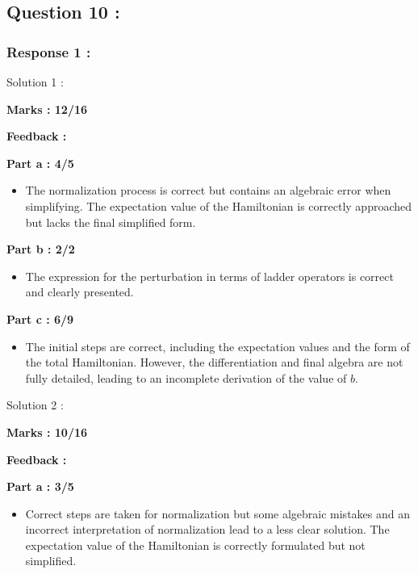 \documentclass[a4paper,11pt]{article}
\begin{document}
\subsection*{Question 10 :}

\subsubsection*{Response 1 :}

Solution 1 :

\textbf{Marks : 12/16}

\textbf{Feedback :}

\textbf{Part a : 4/5}

\begin{itemize}
    \item The normalization process is correct but contains an algebraic error when simplifying. The expectation value of the Hamiltonian is correctly approached but lacks the final simplified form.
\end{itemize}

\textbf{Part b : 2/2}

\begin{itemize}
    \item The expression for the perturbation in terms of ladder operators is correct and clearly presented.
\end{itemize}

\textbf{Part c : 6/9}

\begin{itemize}
    \item The initial steps are correct, including the expectation values and the form of the total Hamiltonian. However, the differentiation and final algebra are not fully detailed, leading to an incomplete derivation of the value of $b$.
\end{itemize}


Solution 2 :

\textbf{Marks : 10/16}

\textbf{Feedback :}

\textbf{Part a : 3/5}

\begin{itemize}
    \item Correct steps are taken for normalization but some algebraic mistakes and an incorrect interpretation of normalization lead to a less clear solution. The expectation value of the Hamiltonian is correctly formulated but not simplified.
\end{itemize}
\end{document}
